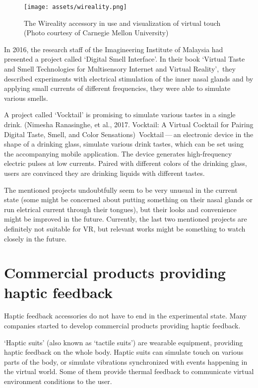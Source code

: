 \begin{figure}[h]{}
\centering\texttt{[image: assets/wireality.png]}
\caption{The Wireality accessory in use and visualization of virtual touch (Photo courtesy of Carnegie Mellon University)}
\end{figure}

In 2016, the research staff of the Imagineering Institute of Malaysia
had presented a project called `Digital Smell Interface'. In their book
`Virtual Taste and Smell Technologies for Multisensory Internet and Virtual
Reality',\,\cite{vrstmivr} they described experiments with electrical stimulation
of the inner nasal glands and by applying small currents of different
frequencies, they were able to simulate various smells.


A project called `Vocktail' is promising to simulate various tastes in a single
drink.
(Nimesha Ranasinghe, et al., 2017. Vocktail: A Virtual Cocktail for Pairing
Digital Taste, Smell, and Color Sensations)\,\cite{vocktail} Vocktail — an electronic
device in the shape of a drinking glass, simulate various drink tastes,
which can be set using the accompanying mobile application. The device
generates high-frequency electric pulses at low currents. Paired with
different colors of the drinking glass, users are convinced they are drinking
liquids with different tastes.


The mentioned projects undoubtfully seem to be very unusual in the current state
(some might be concerned about putting something on their nasal glands or run
eletrical current through their tongues), but their looks and convenience
might be improved in the future. Currently, the last two mentioned projects 
are definitely not suitable for VR, but relevant works might be something to
watch closely in the future.


\hypertarget{x-commercial-products-providing-haptic-feedback}{\section{Commercial products providing haptic feedback}}
Haptic feedback accessories do not have to end in the experimental state.
Many companies started to develop commercial products providing haptic feedback.


`Haptic suits' (also known as `tactile suits') are wearable
equipment, providing haptic feedback on the whole body. Haptic suits can 
simulate touch on various parts of the body, or simulate
vibrations synchronized with events happening in the virtual world. Some
of them provide thermal feedback to communicate virtual environment
conditions to the user.

